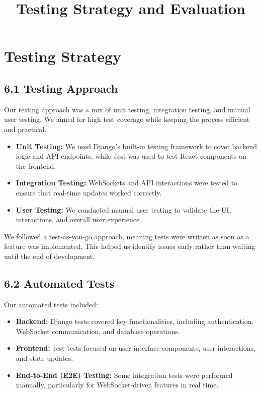 \documentclass{article}
\begin{document}
\title{\textbf{Testing Strategy and Evaluation}}
\author{}
\date{}

\maketitle

\section{Testing Strategy}

\subsection{6.1 Testing Approach}
Our testing approach was a mix of unit testing, integration testing, and manual user testing. We aimed for high test coverage while keeping the process efficient and practical.

\begin{itemize}
    \item \textbf{Unit Testing:} We used Django’s built-in testing framework to cover backend logic and API endpoints, while Jest was used to test React components on the frontend.
    \item \textbf{Integration Testing:} WebSockets and API interactions were tested to ensure that real-time updates worked correctly.
    \item \textbf{User Testing:} We conducted manual user testing to validate the UI, interactions, and overall user experience.
\end{itemize}

We followed a test-as-you-go approach, meaning tests were written as soon as a feature was implemented. This helped us identify issues early rather than waiting until the end of development.

\subsection{6.2 Automated Tests}
Our automated tests included:

\begin{itemize}
    \item \textbf{Backend:} Django tests covered key functionalities, including authentication, WebSocket communication, and database operations.
    \item \textbf{Frontend:} Jest tests focused on user interface components, user interactions, and state updates.
    \item \textbf{End-to-End (E2E) Testing:} Some integration tests were performed manually, particularly for WebSocket-driven features in real time.
\end{itemize}
\end{document}
